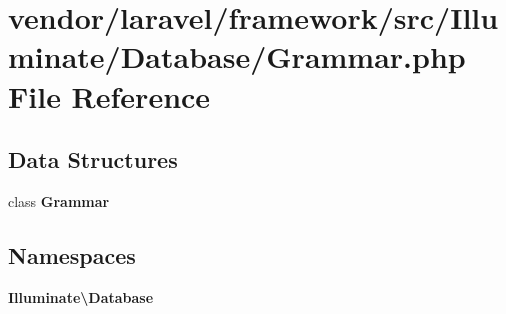 \section{vendor/laravel/framework/src/\+Illuminate/\+Database/\+Grammar.php File Reference}
\label{laravel_2framework_2src_2_illuminate_2_database_2_grammar_8php}
\subsection*{Data Structures}
\begin{DoxyCompactItemize}
\item 
class {\bf Grammar}
\end{DoxyCompactItemize}
\subsection*{Namespaces}
\begin{DoxyCompactItemize}
\item 
 {\bf Illuminate\textbackslash{}\+Database}
\end{DoxyCompactItemize}

